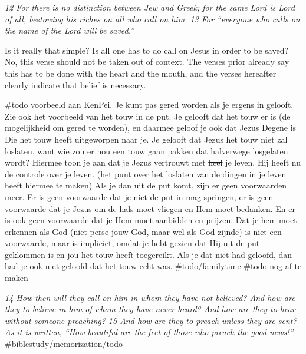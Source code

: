 \emph{12 For there is no distinction between Jew and Greek; for the same
Lord is Lord of all, bestowing his riches on all who call on him. 13 For
``everyone who calls on the name of the Lord will be saved.''}

Is it really that simple? Is all one has to do call on Jesus in order to
be saved? No, this verse should not be taken out of context. The verses
prior already say this has to be done with the heart and the mouth, and
the verses hereafter clearly indicate that belief is necessary.

\#todo voorbeeld aan KenPei. Je kunt pas gered worden als je ergens in
gelooft. Zie ook het voorbeeld van het touw in de put. Je gelooft dat
het touw er is (de mogelijkheid om gered te worden), en daarmee geloof
je ook dat Jezus Degene is Die het touw heeft uitgeworpen naar je. Je
gelooft dat Jezus het touw niet zal loslaten, want wie zou er nou een
touw gaan pakken dat halverwege losgelaten wordt? Hiermee toon je aan
dat je Jezus vertrouwt met \sout{heel} je leven. Hij heeft nu de
controle over je leven. (het punt over het loslaten van de dingen in je
leven heeft hiermee te maken) Als je dan uit de put komt, zijn er geen
voorwaarden meer. Er is geen voorwaarde dat je niet de put in mag
springen, er is geen voorwaarde dat je Jezus om de hals moet vliegen en
Hem moet bedanken. En er is ook geen voorwaarde dat je Hem moet
aanbidden en prijzen. Dat je hem moet erkennen als God (niet perse jouw
God, maar wel als God zijnde) is niet een voorwaarde, maar is impliciet,
omdat je hebt gezien dat Hij uit de put geklommen is en jou het touw
heeft toegereikt. Als je dat niet had geloofd, dan had je ook niet
geloofd dat het touw echt was. \#todo/familytime \#todo nog af te maken

\emph{14 How then will they call on him in whom they have not
believed? And how are they to believe in him of whom they have never
heard? And how are they to hear without someone preaching? 15 And how
are they to preach unless they are sent? As it is written, ``How
beautiful are the feet of those who preach the good news!''}
\#biblestudy/memorization/todo

